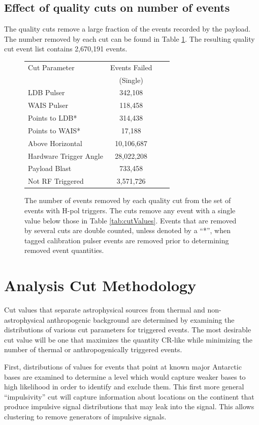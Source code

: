 	\subsection{Effect of quality cuts on number of events}
		The quality cuts remove a large fraction of the events recorded by the payload.  The number removed by each cut can be found in Table \ref{tab:qualityCutReason}.  The resulting quality cut event list contains 2,670,191 events. %
		
		\begin{figure}
		\centering
		\begin{tabular}[c]{|l|c|c|c|}
		\hline
		Cut Parameter & Events Failed  \\
		 & (Single)  \\
		\hline
		LDB Pulser & 342,108 \\
		WAIS Pulser & 118,458 \\
		Points to LDB* & 314,438 \\
		Points to WAIS* & 17,188 \\
		Above Horizontal & 10,106,687 \\
		Hardware Trigger Angle & 28,022,208 \\
		Payload Blast & 733,458 \\
		Not RF Triggered & 3,571,726 \\
		\hline
		\end{tabular}
		\caption{The number of events removed by each quality cut from the set of events with H-pol triggers.  The cuts remove any event with a single value below those in Table \ref{tab:cutValues}.  Events that are removed by several cuts are double counted, unless denoted by a ``*'', when tagged calibration pulser events are removed prior to determining removed event quantities.}
		\label{tab:qualityCutReason}
		\end{figure}



\section{Analysis Cut Methodology}%
	Cut values that separate astrophysical sources from thermal and non-astrophysical anthropogenic background are determined by examining the distributions of various cut parameters for triggered events.  The most desirable cut value will be one that maximizes the quantity CR-like while minimizing the number of thermal or anthropogenically triggered events.
	
	First, distributions of values for events that point at known major Antarctic bases are examined to determine a level which would capture weaker bases to high likelihood in order to identify and exclude them.    This first more general ``impulsivity'' cut will capture information about locations on the continent that produce impulsive signal distributions that may leak into the signal. This allows clustering to remove generators of impulsive signals.
	
